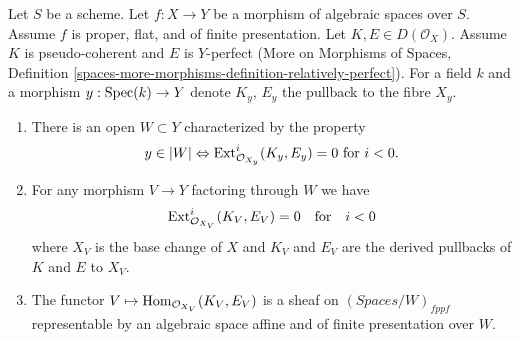 \begin{lemma}
\label{lemma-complexes-open-neg-exts-vanishing}
Let $S$ be a scheme.
Let $f : X \to Y$ be a morphism of algebraic spaces over $S$.
Assume $f$ is proper, flat, and of finite presentation.
Let $K, E \in D(\mathcal{O}_X)$. Assume $K$ is pseudo-coherent
and $E$ is $Y$-perfect (More on Morphisms of Spaces, Definition
\ref{spaces-more-morphisms-definition-relatively-perfect}).
For a field $k$ and a morphism $y : \mathop{\mathrm{Spec}}(k) \to Y$ denote $K_y$, $E_y$
the pullback to the fibre $X_y$.
\begin{enumerate}
\item There is an open $W \subset Y$ characterized by the property
$$
y \in |W|
\Leftrightarrow
\mathop{\mathrm{Ext}}\nolimits^i_{\mathcal{O}_{X_y}}(K_y, E_y) = 0
\text{ for }i < 0.
$$
\item For any morphism $V \to Y$ factoring through $W$ we have
$$
\mathop{\mathrm{Ext}}\nolimits^i_{\mathcal{O}_{X_V}}(K_V, E_V) = 0
\quad\text{for}\quad i < 0
$$
where $X_V$ is the base change of $X$ and $K_V$ and $E_V$
are the derived pullbacks of $K$ and $E$ to $X_V$.
\item The functor $V \mapsto \mathop{\mathrm{Hom}}\nolimits_{\mathcal{O}_{X_V}}(K_V, E_V)$
is a sheaf on $(\textit{Spaces}/W)_{fppf}$ representable by an
algebraic space affine and of finite presentation over $W$.
\end{enumerate}
\end{lemma}

